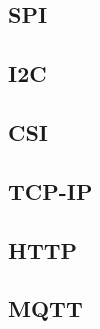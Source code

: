 \subsection{SPI}
\subsection{I2C}

\subsection{CSI}

\subsection{TCP-IP}

\subsection{HTTP}
\subsection{MQTT}
